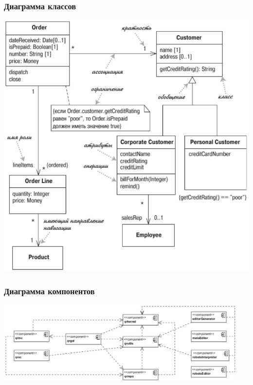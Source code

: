 \documentclass{../../slides-style}
\begin{document}
    \begin{frame}
        \frametitle{Диаграмма классов}
        \begin{center}
            \includegraphics[height=0.8\textheight]{umlClassDiagram.png}
        \end{center}
    \end{frame}

    \begin{frame}
        \frametitle{Диаграмма компонентов}
        \begin{center}
            \includegraphics[width=0.95\textwidth]{componentDiagrams.png}
        \end{center}
    \end{frame}
\end{document}
